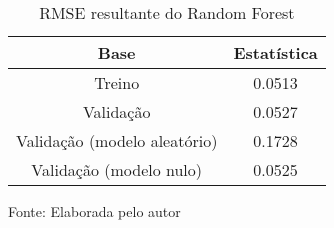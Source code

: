
\begin{table}[h]
\centering
\caption{RMSE resultante do Random Forest}
\label{tab:cap3_rmse_random_forest}
\begin{tabular}{cc}
Base & Estatística \\
\hline
Treino & 0.0513 \\
Validação & 0.0527 \\
Validação (modelo aleatório) & 0.1728 \\
Validação (modelo nulo) & 0.0525 \\
\hline
\end{tabular}

Fonte: Elaborada pelo autor
\end{table}
